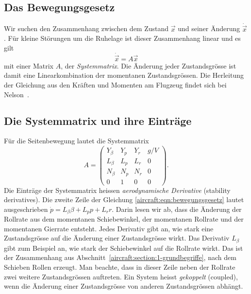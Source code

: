 \subsection{Das Bewegungsgesetz
\label{aircraft:subsection:bewegungsgesetz}}
Wir suchen den Zusammenhang zwischen dem Zustand $\vec{x}$ und seiner
Änderung $\dot{\vec{x}}$.
Für kleine Störungen um die Ruhelage ist dieser Zusammenhang linear
und es gilt
\begin{equation}
    \dot{\vec{x}}
    =
    A\vec{x}
    \label{aircraft:eqn:bewegungsgesetz}
\end{equation}
mit einer Matrix $A$, der \emph{Systemmatrix}.
Die Änderung jeder Zustandsgrösse ist damit eine Linearkombination
der momentanen Zustandsgrössen.
Die Herleitung der Gleichung aus den Kräften und Momenten am Flugzeug
findet sich bei Nelson~\cite[Kapitel 3 und 5]{aircraft:nelson}.

\subsection{Die Systemmatrix und ihre Einträge
\label{aircraft:subsection:systemmatrix}}
Für die Seitenbewegung lautet die Systemmatrix
%
\begin{equation}
    A
    =
    \begin{pmatrix}
        Y_\beta & Y_p & Y_r & g/V \\
        L_\beta & L_p & L_r & 0   \\
        N_\beta & N_p & N_r & 0   \\
        0       & 1   & 0   & 0
    \end{pmatrix}.
    \label{aircraft:eqn:systemmatrix}
\end{equation}
Die Einträge der Systemmatrix heissen \emph{aerodynamische Derivative}
(stability derivatives).
%
%
Die zweite Zeile der Gleichung \eqref{aircraft:eqn:bewegungsgesetz}
lautet ausgeschrieben $\dot p = L_\beta \beta + L_p p + L_r r$.
Darin lesen wir ab, dass die Änderung der Rollrate aus dem momentanen
Schiebewinkel, der momentanen Rollrate und der momentanen Gierrate entsteht.
Jedes Derivativ gibt an, wie stark eine Zustandsgrösse auf die Änderung
einer Zustandsgrösse wirkt.
Das Derivativ $L_\beta$ gibt zum Beispiel an, wie stark der Schiebewinkel
auf die Rollrate wirkt.
Das ist der Zusammenhang aus Abschnitt~\ref{aircraft:section:1-grundbegriffe},
nach dem Schieben Rollen erzeugt.
Man beachte, dass in dieser Zeile neben der Rollrate zwei weitere
Zustandsgrössen auftreten.
Ein System heisst \emph{gekoppelt} (coupled), wenn die Änderung einer
%
%
Zustandsgrösse von anderen Zustandsgrössen abhängt.

